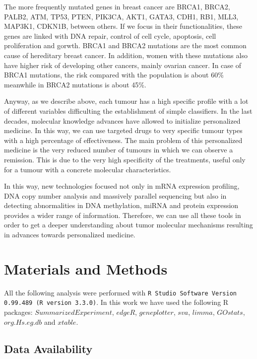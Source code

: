\documentclass[9pt,twocolumn,twoside]{gsajnl}
\begin{document}
The more frequently mutated genes in breast cancer are BRCA1, BRCA2, PALB2, ATM, TP53, PTEN, PIK3CA, AKT1, GATA3, CDH1, RB1, MLL3, MAP3K1, CDKN1B, between others\citep{acs}. If we focus in their functionalities, these genes are linked with DNA repair, control of cell cycle, apoptosis, cell proliferation and gorwth. BRCA1 and BRCA2 mutations are the most common cause of hereditary breast cancer\citep{acs}. In addition, women with these mutations also have higher risk of developing other cancers, mainly ovarian cancer\citep{acs}. In case of BRCA1 mutations, the risk compared with the population is about 60\% meanwhile in BRCA2 mutations is about 45\%\citep{acs}. 
\vspace{2 mm}

Anyway, as we describe above, each tumour has a high specific profile with a lot of different variables difficulting the establishment of simple classifiers. In the last decades, molecular knowledge advances have allowed to initialize personalized medicine. In this way, we can use targeted drugs to very specific tumour types with a high percentage of effectiveness. The main problem of this personalized medicine is the very reduced number of tumours in which we can observe a remission. This is due to the very high specificity of the treatments, useful only for a tumour with a concrete molecular characteristics. 

\vspace{2 mm}

In this way, new technologies focused not only in mRNA expression profiling, DNA copy number analysis and massively parallel sequencing but also in detecting abnormalities in DNA methylation, miRNA and protein expression provides a wider range of information\citep{cangen}. Therefore, we can use all these tools in order to get a deeper understanding about tumor molecular mechanisms resulting in advances towards personalized medicine.

\section*{Materials and Methods}
All the following analysis were performed with \verb+R Studio Software Version 0.99.489 (R version 3.3.0)+. In this work we have used the following R packages: $SummarizedExperiment$, $edgeR$, $geneplotter$, $sva$, $limma$, $GOstats$, $org.Hs.eg.db$ and $xtable$.

\subsection*{Data Availability}
\vspace{2 mm}
\end{document}
